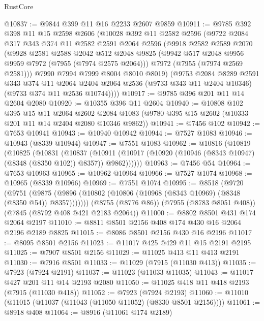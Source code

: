 \begin{lexlean}{RustCore}
\begin{coremodule}
@10837 := @9844 @399 @11 @16 @2233 @2607 @9859
@10911 := @9785
    @392
    @398
    @11
    @15
    @2598
    @2606
    (@10028
      @392
      @11
      @2582
      @2596
      (@9722
        @2084
        @317
        @343
        @374
        @11
        @2582
        @2591
        @2064
        @2596
        (@9918
          @2582
          @2589
          @2070
          (@9928
            @2581
            @2588
            @2042
            @512
            @2048
            @9825
            (@9942 @517 @2048 @9956 @9959 @7972 (@7955 (@7974 @2575 @2064)))
            @7972
            (@7955 (@7974 @2569 @2581)))
          @7990
          @7994
          @7999
          @8004
          @8010
          @8019)
        (@9753
          @2084
          @8289
          @2591
          @343
          @374
          @11
          @2064
          @2404
          @2064
          @2536
          (@9733 @343 @11 @2404 @10346)
          (@9733 @374 @11 @2536 @10744))))
@10917 := @9785 @396 @201 @11 @14 @2604 @2080
@10920 := @10355 @396 @11 @2604
@10940 := @10808
    @102
    @395
    @15
    @11
    @2064
    @2602
    @2084
    @1083
    (@9780 @395 @15 @2602 (@10333 @201 @11 @14 @2404 @2080 @10346 @9862))
@10941 := @7456 @102
@10942 := @7653 @10941
@10943 := @10940 @10942
@10944 := @7527 @1083
@10946 := @10943 (@8339 @10944)
@10947 := @7551 @1083
@10962 := @10816
    (@10819
      (@10825
        (@10831
          (@10837
            (@10911 (@10917 (@10920 (@10946 (@8343 @10947) (@8348 (@8350 @102)) @8357)) @9862))))))
@10963 := @7456 @54
@10964 := @7653 @10963
@10965 := @10962 @10964
@10966 := @7527 @1074
@10968 := @10965 (@8339 @10966)
@10969 := @7551 @1074
@10995 := @8518
    (@9720
      (@9751 (@9875 (@9896 (@10802 (@10806 (@10968 (@8343 @10969) (@8348 (@8350 @54)) @8357)))))))
    (@8755 (@8776 @86))
    (@7955 (@8783 @8051 @408))
    (@7845 (@8792 @408 @421 @2183 @2064))
@11000 := @8802 @8501 @431 @174 @2064 @2197
@11010 := @8811 @8501 @2156 @408 @174 @430 @16 @2064 @2196 @2189 @8825
@11015 := @8086 @8501 @2156 @430 @16 @2196
@11017 := @8095 @8501 @2156
@11023 := @11017 @425 @429 @11 @15 @2191 @2195
@11025 := @7907 @8501 @2156
@11029 := @11025 @413 @11 @413 @2191
@11030 := @7916 @8501
@11033 := @11029 (@7915 (@11030 @413))
@11035 := @7923 (@7924 @2191)
@11037 := @11023 (@11033 @11035)
@11043 := @11017 @427 @201 @11 @14 @2193 @2080
@11050 := @11025 @418 @11 @418 @2193 (@7915 (@11030 @418))
@11052 := @7923 (@7924 @2193)
@11060 := @11010 (@11015 (@11037 (@11043 (@11050 @11052) (@8330 @8501 @2156))))
@11061 := @8918 @408
@11064 := @8916 (@11061 @174 @2189)

\end{coremodule}
\end{lexlean}
